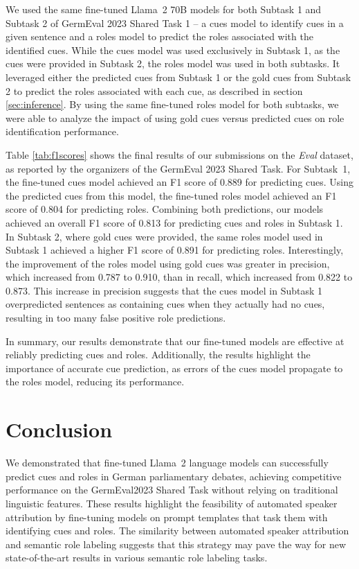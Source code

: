 \documentclass[11pt,a4paper]{article}
\begin{document}
We used the same fine-tuned Llama~2 70B models for both Subtask 1 and Subtask 2 of GermEval 2023 Shared Task 1 -- a cues model to identify cues in a given sentence and a roles model to predict the roles associated with the identified cues.
While the cues model was used exclusively in Subtask 1, as the cues were provided in Subtask 2, the roles model was used in both subtasks. 
It leveraged either the predicted cues from Subtask 1 or the gold cues from Subtask 2 to predict the roles associated with each cue, as described in section \ref{sec:inference}.
By using the same fine-tuned roles model for both subtasks, we were able to analyze the impact of using gold cues versus predicted cues on role identification performance.

Table \ref{tab:f1scores} shows the final results of our submissions on the \emph{Eval} dataset, as reported by the organizers of the GermEval 2023 Shared Task.
For Subtask~1, the fine-tuned cues model achieved an F1 score of 0.889 for predicting cues.
Using the predicted cues from this model, the fine-tuned roles model achieved an F1 score of 0.804 for predicting roles.
Combining both predictions, our models achieved an overall F1 score of 0.813 for predicting cues and roles in Subtask 1.
In Subtask 2, where gold cues were provided, the same roles model used in Subtask 1 achieved a higher F1 score of 0.891 for predicting roles.
Interestingly, the improvement of the roles model using gold cues was greater in precision, which increased from 0.787 to 0.910, than in recall, which increased from 0.822 to 0.873.
This increase in precision suggests that the cues model in Subtask 1 overpredicted sentences as containing cues when they actually had no cues, resulting in too many false positive role predictions.

In summary, our results demonstrate that our fine-tuned models are effective at reliably predicting cues and roles.
Additionally, the results highlight the importance of accurate cue prediction, as errors of the cues model propagate to the roles model, reducing its performance.
 
\section{Conclusion}

We demonstrated that fine-tuned Llama~2 language models can successfully predict cues and roles in German parliamentary debates, achieving competitive performance on the GermEval2023 Shared Task without relying on traditional linguistic features. These results highlight the feasibility of automated speaker attribution by fine-tuning models on prompt templates that task them with identifying cues and roles. The similarity between automated speaker attribution and semantic role labeling suggests that this strategy may pave the way for new state-of-the-art results in various semantic role labeling tasks.
 
\end{document}
